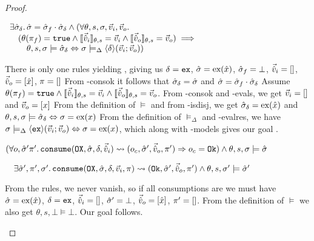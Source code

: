 \begin{proof}
\pfassume \begin{hypvlist}
 
\end{hypvlist}
\pfprove \begin{goalvlist}
 $\begin{array}{l}
\exists \hat{\sigma}_\delta\ldotp \hat{\sigma}=\hat{\sigma}_f\cdot\hat{\sigma}_\delta\land (\forall\theta,s,\sigma,\vec{v}_i,\vec{v}_o\ldotp \\
\quad (\theta(\pi_f)=\texttt{true} \land \llbracket\vec{\hat{v}}_i\rrbracket_{\theta,s} = \vec{v}_i \land \llbracket\vec{\hat{v}}_o\rrbracket_{\theta,s}=\vec{v}_o) \implies\\
\qquad \theta,s,\sigma\models \hat{\sigma}_\delta \Leftrightarrow \sigma \models_\Delta \left<\delta\right>\!(\vec{v}_i;\vec{v}_o))
\end{array}$
\end{goalvlist}
\begin{hypvlist}
 There is only one \consume{} rules yielding \Ok, giving us $\delta=\texttt{ex}$, $\hat{\sigma}=\text{ex}(\hat{x})$, $\hat{\sigma}_f=\bot$, $\vec{\hat{v}}_i=[]$, $\vec{\hat{v}}_o=[\hat{x}]$, $\pi=[]$
 From \hyp{consok} it follows that $\hat{\sigma}_\delta=\hat{\sigma}$ and $\hat{\sigma}=\hat{\sigma}_f\cdot\hat{\sigma}_\delta$
 Assume $\theta(\pi_f)=\texttt{true} \land \llbracket\vec{\hat{v}}_i\rrbracket_{\theta,s} = \vec{v}_i \land \llbracket\vec{\hat{v}}_o\rrbracket_{\theta,s}=\vec{v}_o$.
 From \hyp{consok} and \hyp{evals}, we get $\vec{v}_i=[]$ and $\vec{v}_o=[x]$
 From the definition of $\models$ and from \hyp{isdisj}, we get $\hat{\sigma}_\delta=\text{ex}(\hat{x})$ and ${\theta,s,\sigma\models\hat{\sigma}_\delta} \Leftrightarrow {\sigma=\text{ex}(x)}$
 From the definition of $\models_\Delta$ and \hyp{evalres}, we have $\sigma\models_\Delta\left<\texttt{ex}\right>\!(\vec{v}_i;\vec{v}_o)\Leftrightarrow \sigma=\text{ex}(x)$, which along with \hyp{models} gives our goal .
\end{hypvlist}


\pfassume \begin{hypvlist}
 $(\forall o, \hat{\sigma}'\pi'\ldotp \texttt{consume}(\texttt{OX},\hat{\sigma},\delta,\vec{\hat{v}}_i)\rightsquigarrow (o_c, \hat{\sigma}', \vec{\hat{v}}_o, \pi')\Rightarrow o_c = \texttt{Ok})\land \theta, s, \sigma \models \hat{\sigma}$
\end{hypvlist}
\pfprove \begin{goalvlist}
 $\quad \exists  \hat{\sigma}', \pi', \sigma'\ldotp \texttt{consume}(\texttt{OX}, \hat{\sigma}, \delta,\vec{v}_i,\pi)\rightsquigarrow (\texttt{Ok}, \hat{\sigma}', \vec{\hat{v}}_o, \pi') \land \theta,s,\sigma' \models \hat{\sigma}'$
\end{goalvlist}
\begin{hypvlist}
 From the \consume{} rules, we never vanish, so if all consumptions are \Ok{} we must have $\hat{\sigma}=\text{ex}(\hat{x})$, $\delta=\texttt{ex}$, $\vec{\hat{v}}_i=[]$, $\hat{\sigma}'=\bot$, $\vec{\hat{v}}_o=[\hat{x}]$, $\pi'=[]$.
 From the definition of $\models$ we also get $\theta,s,\bot\models\bot$. Our goal  follows.
\end{hypvlist}


\end{proof}
